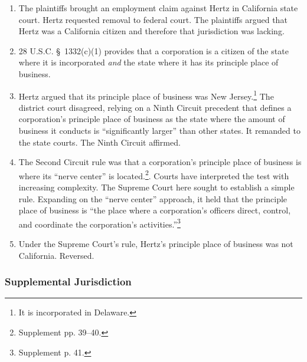 \begin{enumerate}
    \item The plaintiffs brought an employment claim against Hertz in 
    California state court. Hertz requested removal to federal court. The 
    plaintiffs argued that Hertz was a California citizen and therefore that 
    jurisdiction was lacking.
    \item 28 U.S.C. \S\ 1332(c)(1) provides that a corporation is a citizen of 
    the state where it is incorporated \emph{and} the state where it has its 
    principle place of business.
    \item Hertz argued that its principle place of business was New 
    Jersey.\footnote{It is incorporated in Delaware.} The district court 
    disagreed, relying on a Ninth Circuit precedent that defines a 
    corporation's principle place of business as the state where the amount of 
    business it conducts is ``significantly larger'' than other states. It 
    remanded to the state courts. The Ninth Circuit affirmed.
    \item The Second Circuit rule was that a corporation's principle place of 
    business is where its ``nerve center'' is located.\footnote{Supplement pp.  
    39--40.}. Courts have interpreted the test with increasing complexity. The 
    Supreme Court here sought to establish a simple rule. Expanding on the 
    ``nerve center'' approach, it held that the principle place of business is 
    ``the place where a corporation's officers direct, control, and coordinate 
    the corporation's activities.''\footnote{Supplement p. 41.}
    \item Under the Supreme Court's rule, Hertz's principle place of business 
    was not California. Reversed.
\end{enumerate}

\subsubsection{Supplemental Jurisdiction}

